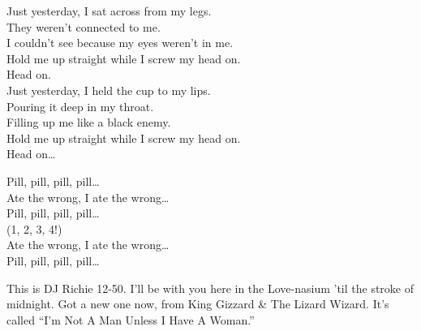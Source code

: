 
\label{album:float-along-fill-your-lungs}






Just yesterday, I sat across from my legs. \\
They weren't connected to me. \\
I couldn't see because my eyes weren't in me. \\
Hold me up straight while I screw my head on. \\

Head on. \\

Just yesterday, I held the cup to my lips. \\
Pouring it deep in my throat. \\
Filling up me like a black enemy. \\
Hold me up straight while I screw my head on. \\

Head on… \\


Pill, pill, pill, pill… \\

Ate the wrong, I ate the wrong… \\

Pill, pill, pill, pill… \\

(1, 2, 3, 4!) \\

Ate the wrong, I ate the wrong… \\

Pill, pill, pill, pill… \\





This is DJ Richie 12-50. I'll be with you here in the Love-nasium 'til the stroke of midnight. Got a new one now, from King Gizzard \& The Lizard Wizard. It's called ``I'm Not A Man Unless I Have A Woman.'' \\

